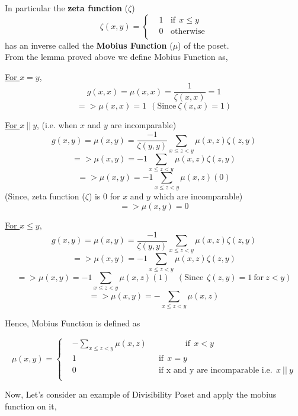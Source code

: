 
\noindent In particular the \textbf{zeta function} ($\zeta$)
$$ \zeta (x, y) =  
\begin{cases}
&1 ~~~~\textrm{if} ~~x \le y \\
&0 ~~~~\textrm{otherwise} \\
\end{cases}
$$
has an inverse called the \textbf{Mobius Function} ($\mu$) of the poset.\\

\noindent From the lemma proved above we define Mobius Function as,

\noindent \underline{For $x = y$},
$$g(x,x) = \mu(x,x) = \frac{1}{\zeta (x,x)} = 1$$
$$=> \boxed{\mu(x,x) = 1 ~~ (\textrm{Since} ~\zeta (x,x) = 1)}$$

\noindent \underline{For $x ~ || ~ y$}, (i.e. when $x$ and $y$ are incomparable)
$$g(x,y) = \mu(x,y) = \frac{-1}{\zeta(y,y)}\sum_{x \le z < y} \mu(x,z) \zeta(z,y)$$
$$=> \mu(x,y) = -1\sum_{x \le z < y} \mu(x,z) \zeta(z,y) $$
$$=> \mu(x,y) = -1\sum_{x \le z < y} \mu(x,z) (0) $$
(Since, zeta function ($\zeta$) is $0$ for $x$ and $y$ which are incomparable)
$$=> \boxed{\mu(x,y) = 0}$$

\noindent \underline{For $x \le y$},
$$g(x,y) = \mu(x,y) = \frac{-1}{\zeta(y,y)}\sum_{x \le z < y} \mu(x,z) \zeta(z,y)$$
$$=> \mu(x,y) = -1\sum_{x \le z < y} \mu(x,z) \zeta(z,y) $$
$$=> \mu(x,y) = -1\sum_{x \le z < y} \mu(x,z) (1) ~~~~(\textrm{Since}~~ \zeta(z,y) = 1 ~ \textrm{for} ~z < y)$$
$$=> \boxed{\mu(x,y) = -\sum_{x \le z < y} \mu(x,z)}$$

Hence, Mobius Function is defined as

\begin{equation}
\mu (x, y) =  
    \begin{cases}
    &-\sum\limits_{x \le z < y} \mu(x,z) ~~~~~~~~~~~~~~~~~~~~~\textrm{if} ~~x < y \\
    &1 ~~~~~~~~~~~~~~~~~~~~~~~~~~~~~~~~~~~~~~~~~~~~~\textrm{if} ~~ x=y \\
    &0 ~~~~~~~~~~~~~~~~~~~~~~~~~~~~~~~~~~~~~~~~~~~~~\textrm{if x and y are incomparable i.e.} ~~ x ~||~ y\\
    \end{cases}
\end{equation}


\noindent Now, Let's consider an example of Divisibility Poset and apply the mobius function on it, 

